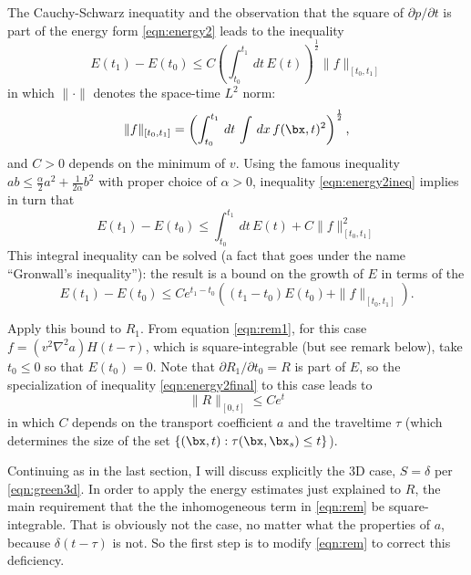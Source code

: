 The Cauchy-Schwarz inequatity and the observation that the square of
$\partial p/\partial t$ is part of the energy form \ref{eqn:energy2} leads to the
inequality
\begin{equation}
\label{eqn:energy2ineq}
E(t_1)-E(t_0) \le C
\left(\int_{t_0}^{t_1}\,dt\,E(t)\right)^{\frac{1}{2}} \|f\|_{[t_0,t_1]}
\end{equation}
in which $\|\cdot\|$ denotes the space-time $L^2$ norm:
\begin{equation}
\label{eqn:L2}
\|f\|_{[t_0,t_1]} = \left(\int_{t_0}^{t_1}\,dt\,\int \,dx\, f(\bx,t)^2
  \right)^{\frac{1}{2}},
\end{equation}
and $C>0$ depends on the minimum of $v$. Using the famous inequality
$ab \le \frac{\alpha}{2}a^2 + \frac{1}{2\alpha}b^2$ with proper choice
of $\alpha>0$, inequality \ref{eqn:energy2ineq} implies in turn that
\begin{equation}
\label{eqn:energy2gron}
E(t_1)-E(t_0) \le 
\int_{t_0}^{t_1}\,dt\,E(t) + C \|f\|_{[t_0,t_1]}^2
\end{equation}
This integral inequality can be solved (a fact that goes under the
name ``Gronwall's inequality''): the result is a bound on the growth
of $E$ in terms of the 
\begin{equation}
\label{eqn:energy2final}
E(t_1)-E(t_0) \le Ce^{t_1-t_0}((t_1-t_0)E(t_0) + \|f\|_{[t_0,t_1]}).
\end{equation}

Apply this bound to $R_1$. From equation \ref{eqn:rem1}, for this case
$f = (v^2\nabla^2 a) H(t-\tau)$, which is square-integrable (but see
remark below), take $t_0 \le 0$ so that $E(t_0) =0$. Note that
$\partial R_1/\partial t_0 = R$ is part of $E$, so the specialization
of inequality \ref{eqn:energy2final} to this case leads to
\begin{equation}
\label{eqn:rem2}
\|R\|_{[0,t]} \le Ce^t
\end{equation}
in which $C$ depends on the transport coefficient $a$ and the
traveltime $\tau$ (which determines the size of the set $\{(\bx,t):
\tau(\bx,\bx_s) \le t\}$). 

Continuing as in the last section, I will discuss explicitly the 3D
case, $S = \delta$ per \ref{eqn:green3d}. In order to apply the energy
estimates just explained to $R$, the main requirement that the
the inhomogeneous term in \ref{eqn:rem} be square-integrable. That is
obviously not the case, no matter what the properties of $a$, because
$\delta(t-\tau)$ is not. So the first step is to modify \ref{eqn:rem} to
correct this deficiency.

